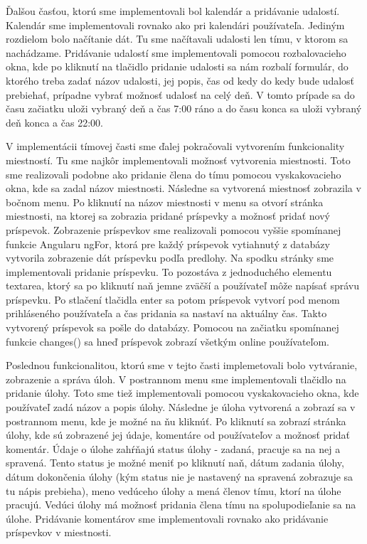 \indent Ďalšou časťou, ktorú sme implementovali bol kalendár a pridávanie udalostí. Kalendár sme implementovali rovnako ako pri kalendári používateľa. Jediným rozdielom bolo načítanie dát. Tu sme načítavali udalosti len tímu, v ktorom sa nachádzame. Pridávanie udalostí sme implementovali pomocou rozbalovacieho okna, kde po kliknutí na tlačidlo pridanie udalosti sa nám rozbalí formulár, do ktorého treba zadať názov udalosti, jej popis, čas od kedy do kedy bude udalosť prebiehať, prípadne vybrať možnosť udalosť na celý deň. V tomto prípade sa do času začiatku uloži vybraný deň a čas 7:00 ráno a do času konca sa uloži vybraný deň konca a čas 22:00. 

\indent V implementácii tímovej časti sme ďalej pokračovali vytvorením funkcionality miestností. Tu sme najkôr implementovali možnosť vytvorenia miestnosti. Toto sme realizovali podobne ako pridanie člena do tímu pomocou vyskakovacieho okna, kde sa zadal názov miestnosti. Následne sa vytvorená miestnosť zobrazila v bočnom menu. Po kliknutí na názov miestnosti v menu sa otvorí stránka miestnosti, na ktorej sa zobrazia pridané príspevky a možnosť pridať nový príspevok. Zobrazenie príspevkov sme realizovali pomocou vyššie spomínanej funkcie Angularu ngFor, ktorá pre každý príspevok vytiahnutý z databázy vytvorila zobrazenie dát príspevku podľa predlohy. Na spodku stránky sme implementovali pridanie príspevku. To pozostáva z jednoduchého elementu textarea, ktorý sa po kliknutí naň jemne zväčší a používateľ môže napísať správu príspevku. Po stlačení tlačidla enter sa potom príspevok vytvorí pod menom prihláseného používateľa a čas pridania sa nastaví na aktuálny čas. Takto vytvorený príspevok sa pošle do databázy. Pomocou na začiatku spomínanej funkcie changes() sa hneď príspevok zobrazí všetkým online používateľom. 

\indent Poslednou funkcionalitou, ktorú sme v tejto časti implemetovali bolo vytváranie, zobrazenie a správa úloh. V postrannom menu sme implementovali tlačidlo na pridanie úlohy. Toto sme tiež implementovali pomocou vyskakovacieho okna, kde používateľ zadá názov a popis úlohy. Následne je úloha vytvorená a zobrazí sa v postrannom menu, kde je možné na ňu kliknúť. Po kliknutí sa zobrazí stránka úlohy, kde sú zobrazené jej údaje, komentáre od používateľov a možnosť pridať komentár. Údaje o úlohe zahŕňajú status úlohy - zadaná, pracuje sa na nej a spravená. Tento status je možné meniť po kliknutí naň, dátum zadania úlohy, dátum dokončenia úlohy (kým status nie je nastavený na spravená zobrazuje sa tu nápis prebieha), meno vedúceho úlohy a mená členov tímu, ktorí na úlohe pracujú. Vedúci úlohy má možnosť pridania člena tímu na spolupodieľanie sa na úlohe. Pridávanie komentárov sme implementovali rovnako ako pridávanie príspevkov v miestnosti. 

